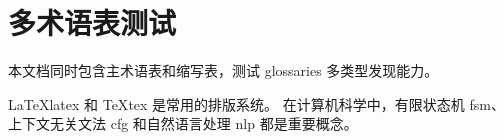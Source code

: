 \documentclass{article}
\begin{document}
\section{多术语表测试}

本文档同时包含主术语表和缩写表，测试 glossaries 多类型发现能力。

\LaTeX \gls{latex} 和 \TeX \gls{tex} 是常用的排版系统。
在计算机科学中，有限状态机 \acrshort{fsm}、上下文无关文法 \acrfull{cfg}
和自然语言处理 \gls{nlp} 都是重要概念。

\printglossary
\printglossary[type=\acronymtype]
\end{document}
